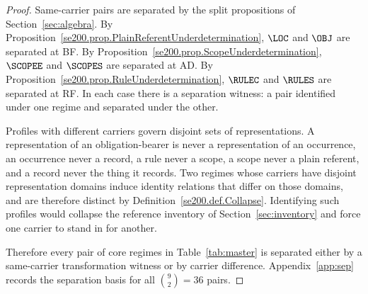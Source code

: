 \begin{proof}
  Same-carrier pairs are separated by the split propositions of Section~\ref{sec:algebra}.
  By Proposition~\ref{se200.prop.PlainReferentUnderdetermination}, $\LOC$ and $\OBJ$ are separated at BF.
  By Proposition~\ref{se200.prop.ScopeUnderdetermination}, $\SCOPEE$ and $\SCOPES$ are separated at AD.
  By Proposition~\ref{se200.prop.RuleUnderdetermination}, $\RULEC$ and $\RULES$ are separated at RF.
  In each case there is a separation witness: a pair identified under one regime and separated under the other.

  Profiles with different carriers govern disjoint sets of representations.
  A representation of an obligation-bearer is never a representation of an occurrence,
  an occurrence never a record,
  a rule never a scope,
  a scope never a plain referent,
  and a record never the thing it records.
  Two regimes whose carriers have disjoint representation domains induce
  identity relations that differ on those domains,
  and are therefore distinct by Definition~\ref{se200.def.Collapse}.
  Identifying such profiles would collapse the reference inventory of
  Section~\ref{sec:inventory} and force one carrier to stand in for another.

  Therefore every pair of core regimes in Table~\ref{tab:master}
  is separated either by a same-carrier transformation witness
  or by carrier difference.
  Appendix~\ref{app:sep} records the separation basis for all $\binom{9}{2}=36$ pairs.
\end{proof}
